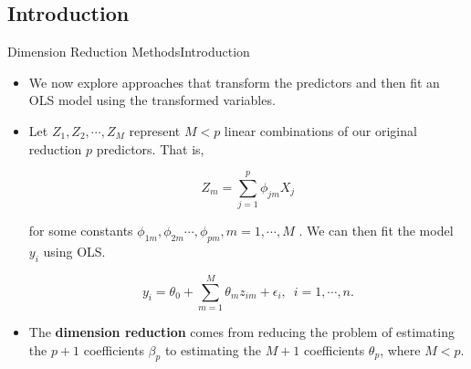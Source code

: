 \subsection{Introduction}
\begin{frame}{Dimension Reduction Methods}{Introduction}

\begin{itemize}
    \item We now explore approaches that transform the predictors and then fit an OLS model using the transformed variables. \pause 

    \item Let $Z_1 , Z_2 , \cdots , Z_M$ represent $M < p$ linear combinations of our original reduction $p$ predictors. That is, \pause 

    \begin{equation}\label{eq:z-combs}
        Z_m = \sum_{j=1}^p \phi_{jm} X_j
    \end{equation} \pause 

    for some constants $\phi_{1m} , \phi_{2m} \cdots , \phi_{pm} , m = 1, \cdots , M$ . \pause We can then fit the model $y_i$ using OLS. \pause 

    \begin{equation}\label{eq:linear_dim}
        y_i = \theta_0 + \sum_{m=1}^M \theta_m z_{im} + \epsilon_i, \, \, \, i=1, \cdots, n. 
    \end{equation} \pause 
     
     \item The \textbf{dimension reduction} comes from reducing the problem of estimating the $p + 1$ coeﬃcients $\beta_p$ to estimating the $M + 1$ coeﬃcients $\theta_p$, where $M < p$.
\end{itemize}
    
\end{frame}

